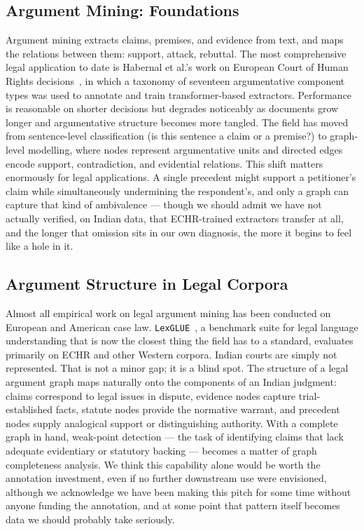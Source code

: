 \subsection{Argument Mining: Foundations}

Argument mining extracts claims, premises, and evidence from text, and maps the relations between them: support, attack, rebuttal. The most comprehensive legal application to date is Habernal et al.'s work on European Court of Human Rights decisions~\cite{habernal-etal-2023-mining}, in which a taxonomy of seventeen argumentative component types was used to annotate and train transformer-based extractors. Performance is reasonable on shorter decisions but degrades noticeably as documents grow longer and argumentative structure becomes more tangled. The field has moved from sentence-level classification (is this sentence a claim or a premise?) to graph-level modelling, where nodes represent argumentative units and directed edges encode support, contradiction, and evidential relations. This shift matters enormously for legal applications. A single precedent might support a petitioner's claim while simultaneously undermining the respondent's, and only a graph can capture that kind of ambivalence — though we should admit we have not actually verified, on Indian data, that ECHR-trained extractors transfer at all, and the longer that omission sits in our own diagnosis, the more it begins to feel like a hole in it.

\subsection{Argument Structure in Legal Corpora}

Almost all empirical work on legal argument mining has been conducted on European and American case law. \texttt{LexGLUE}~\cite{chalkidis-etal-2022-lexglue}, a benchmark suite for legal language understanding that is now the closest thing the field has to a standard, evaluates primarily on ECHR and other Western corpora. Indian courts are simply not represented. That is not a minor gap; it is a blind spot. The structure of a legal argument graph maps naturally onto the components of an Indian judgment: claims correspond to legal issues in dispute, evidence nodes capture trial-established facts, statute nodes provide the normative warrant, and precedent nodes supply analogical support or distinguishing authority. With a complete graph in hand, weak-point detection — the task of identifying claims that lack adequate evidentiary or statutory backing — becomes a matter of graph completeness analysis. We think this capability alone would be worth the annotation investment, even if no further downstream use were envisioned, although we acknowledge we have been making this pitch for some time without anyone funding the annotation, and at some point that pattern itself becomes data we should probably take seriously.

